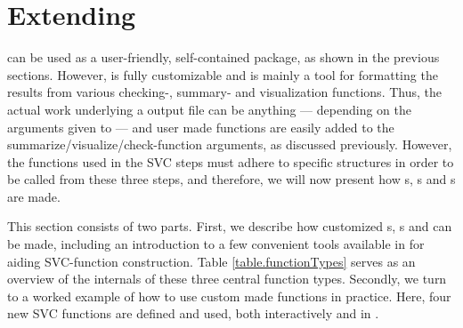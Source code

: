 \documentclass[article,shortnames]{jss}
\begin{document}
\section[Extending dataMaid]{Extending }
\label{sec:extending}

 can be used as a user-friendly, self-contained package, as
shown in the previous sections. However,  is fully
customizable and  is mainly a tool for formatting the
results from various checking-, summary- and visualization
functions. Thus, the actual work underlying a  output file
can be anything --- depending on the arguments given to 
--- and user made functions are easily added to the
summarize/visualize/check-function arguments, as discussed previously.
However, the functions used in the SVC steps must adhere
to specific structures in order to be called from these three steps, and
therefore, we will now present how s,
s and s are made.


This section consists of two parts. First, we describe how customized s,
s and  can be made, including an introduction to a
few convenient tools available in  for aiding SVC-function construction.
Table \ref{table.functionTypes} serves as an overview of the internals of these three
central function types. Secondly, we turn to a
worked example of how to use custom made functions in practice. Here,
four new SVC functions are defined and used, both interactively and in .
\end{document}
